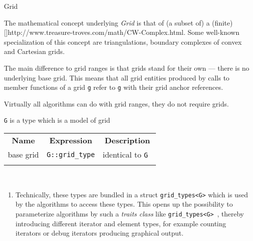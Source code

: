 \begin{Label}{Grid}
\end{Label}

The  mathematical concept underlying {\em  Grid }    
is that of (a subset of) a (finite)     
[\cite{weingram}]{http://www.treasure-troves.com/math/CW-Complex.html}. 
Some well-known specialization of this concept are    
triangulations, boundary complexes of convex  
and Cartesian grids.     


The main difference to grid ranges is that grids stand for their own ---
there is no underlying base grid. 
This means that all grid entities produced by calls to member functions of a grid      
{\tt  g} refer to {\tt  g} with their grid anchor references.    

Virtually all algorithms can do with grid ranges, they do not require grids.    

{\tt  G} is a type which is a model of grid      

    
\begin{tabular}{ccc} 
  \T \\   \hline
  {\bf  Name  } & {\bf  Expression  } & {\bf  Description  } \\ 
  \hline 
  base grid  & {\tt  G::grid\_type}  & identical to {\tt  G }  
  \T \\   \hline  \\
\end{tabular}


\\

 \begin{enumerate}
   \item Technically, these types are bundled in a struct 
     {\tt  grid\_types<G>}      
     which is used by the algorithms to access these types. 
     This opens up the possibility  to parameterize algorithms by such a {\em  traits class } 
     like {\tt  grid\_types<G> },      
     thereby introducing different iterator and element types, 
     for example counting iterators or debug iterators producing graphical output.    
\end{enumerate}

 ~
 ~ 
